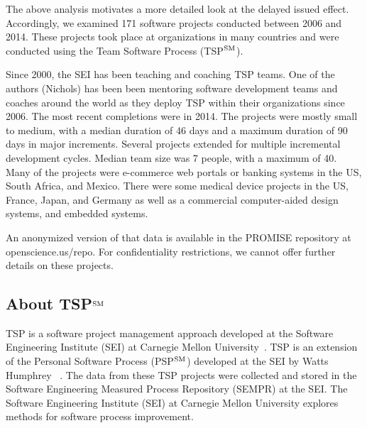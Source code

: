 The above analysis motivates a more detailed look at the delayed issued effect.  
Accordingly, we examined 171 software projects conducted between 2006 and 2014. These projects took place at organizations in many countries and were conducted using  the Team Software Process (TSP$\textsuperscript{SM}$).

Since 2000, the SEI has been teaching and coaching TSP teams. One of the authors (Nichols) has been been mentoring software development teams and coaches around the world as they deploy TSP within their organizations since 2006.  The  most recent completions were in 2014.
The projects were mostly small to medium, with a median duration of 46 days and a maximum duration of 90 days in major increments. 
Several projects extended for multiple incremental development cycles. 
Median team size was 7 people, with a maximum of 40. 
Many of the projects were e-commerce web portals or banking systems in the US, South Africa, and Mexico. 
There were  some  medical device projects in  the US, France, Japan, and Germany as well  as a commercial computer-aided design systems, and embedded systems. 

An anonymized version of that data is available in the PROMISE repository at openscience.us/repo.
For confidentiality restrictions, we cannot offer 
further details on these projects.

\subsection{About TSP$\textsuperscript{SM}$}

TSP is a software project management approach developed at the Software Engineering Institute (SEI) at Carnegie Mellon University~\cite{tsp00}. TSP is an extension of the Personal Software Process (PSP$\textsuperscript{SM}$) developed at the SEI by Watts Humphrey ~\cite{tsp00}. The data from these TSP projects were collected and stored in the Software Engineering Measured Process Repository (SEMPR) at the SEI. The Software Engineering Institute (SEI) at Carnegie Mellon University explores methods for software process improvement.
 


